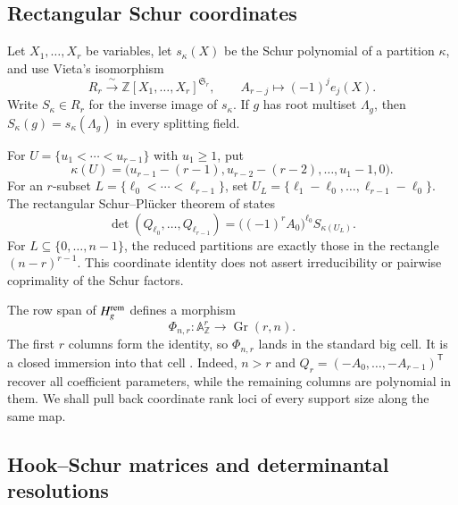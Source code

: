 \documentclass[10pt,fleqn]{article}
\numberwithin{equation}{section}
\newcommand{\A}{\mathbb A}
\newcommand{\Gr}{\operatorname{Gr}}
\begin{document}
\subsection{Rectangular Schur coordinates}

Let $X_1,\ldots,X_r$ be variables, let $s_\kappa(X)$ be the Schur polynomial of a
partition $\kappa$, and use Vieta's isomorphism
\begin{equation}\label{eq:vieta}
 R_r\xrightarrow{\ \sim\ }\mathbb Z[X_1,\ldots,X_r]^{\mathfrak S_r},
 \qquad A_{r-j}\longmapsto(-1)^je_j(X).
\end{equation}
Write $S_\kappa\in R_r$ for the inverse image of $s_\kappa$.  If $g$ has root multiset
$\Lambda_g$, then $S_\kappa(g)=s_\kappa(\Lambda_g)$ in every splitting field.

For $U=\{u_1<\cdots<u_{r-1}\}$ with $u_1\ge1$, put
\begin{equation}\label{eq:kappa-U}
 \kappa(U)=
 \bigl(u_{r-1}-(r-1),u_{r-2}-(r-2),\ldots,u_1-1,0\bigr).
\end{equation}
For an $r$-subset $L=\{\ell_0<\cdots<\ell_{r-1}\}$, set
$U_L=\{\ell_1-\ell_0,\ldots,\ell_{r-1}-\ell_0\}$.  The rectangular
Schur--Pl\"ucker theorem of \cite[Theorem 3.3]{LiYuanSchur} states
\begin{equation}\label{eq:prior-schur-plucker}
 \det(Q_{\ell_0},\ldots,Q_{\ell_{r-1}})
 =\bigl((-1)^rA_0\bigr)^{\ell_0}S_{\kappa(U_L)}.
\end{equation}
For $L\subseteq\{0,\ldots,n-1\}$, the reduced partitions are exactly those in the rectangle
$(n-r)^{r-1}$.  This coordinate identity does not assert irreducibility or
pairwise coprimality of the Schur factors.

The row span of $H_g^{\rm rem}$ defines a morphism
\begin{equation}\label{eq:grassmann-map}
 \Phi_{n,r}:\A_{\mathbb Z}^r\longrightarrow\Gr(r,n).
\end{equation}
The first $r$ columns form the identity, so $\Phi_{n,r}$ lands in the standard big cell.
It is a closed immersion into that cell \cite[Proposition 2.4]{LiYuanSchur}.
Indeed, $n>r$ and
$Q_r=(-A_0,\ldots,-A_{r-1})^{\mathsf T}$ recover all
coefficient parameters, while the remaining columns are
polynomial in them.
We shall pull back coordinate rank loci of every support size along the same map.


\subsection{Hook--Schur matrices and determinantal resolutions}\label{sec:schur}
\end{document}
